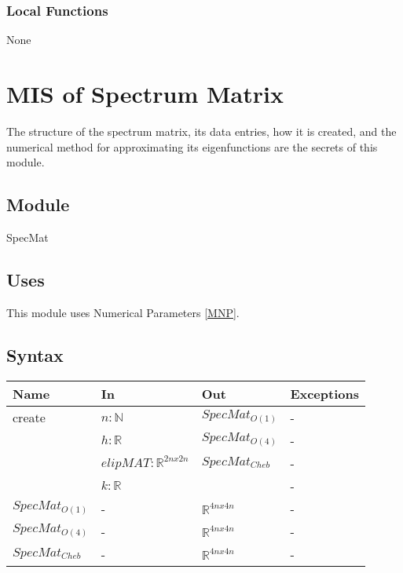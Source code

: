 \documentclass[12pt, titlepage]{article}
\begin{document}
\subsubsection{Local Functions}

None

\newpage
\section{MIS of Spectrum Matrix} \label{SSM}

The structure of the spectrum matrix, its data entries, how 
it is created, and the numerical method for approximating its 
eigenfunctions are the secrets of this module.  

\subsection{Module}

SpecMat

\subsection{Uses}

This module uses Numerical Parameters \ref{MNP}. 

\subsection{Syntax}

\begin{center}
	\begin{tabular}{p{3cm} p{5cm} p{3cm} >{\raggedright\arraybackslash}p{5cm}}
		\toprule
		\textbf{Name} & \textbf{In} & \textbf{Out} & \textbf{Exceptions} \\
		\hline
		create & $n : \mathbb{N} $ &$SpecMat_{O(1)}$ & - \\ 
		 & $h : \mathbb{R} $& $SpecMat_{O(4)}$ & - \\ 
		 & $elipMAT : \mathbb{R}^{2nx2n} $ &$SpecMat_{Cheb}$ & - \\ 
		 & $k : \mathbb{R} $ & & - \\
		$SpecMat_{O(1)}$ & - & $\mathbb{R}^{4nx4n}$ & - \\
		$SpecMat_{O(4)}$ & - & $\mathbb{R}^{4nx4n}$ & - \\ 
		$SpecMat_{Cheb}$ & - & $\mathbb{R}^{4nx4n}$ & - \\
		\hline
	\end{tabular}
\end{center}
\end{document}
